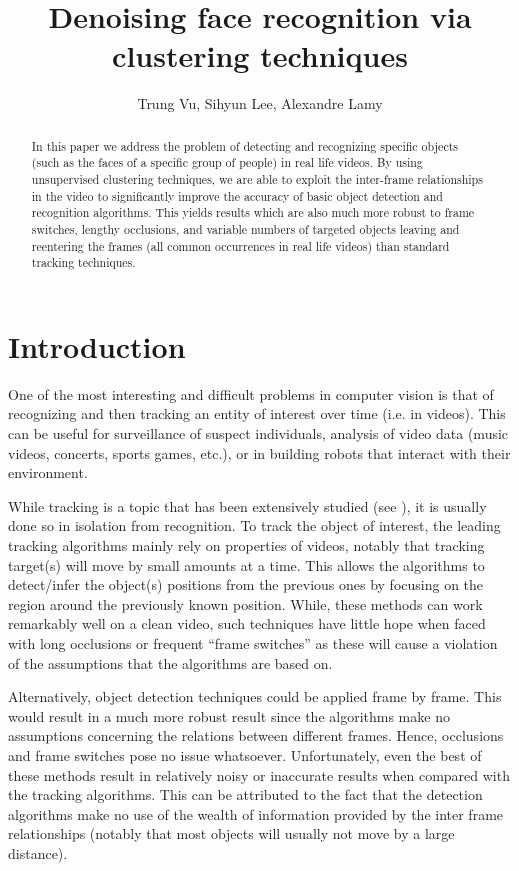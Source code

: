 \documentclass{article}
\title{Denoising face recognition via clustering techniques}
\author{Trung Vu, Sihyun Lee, Alexandre Lamy%
}
\begin{document}

\maketitle

\begin{abstract}
  In this paper we address the problem of detecting and recognizing specific objects (such as the faces of a specific group of people)
  in real life videos. By using unsupervised clustering techniques, we are able to exploit the inter-frame relationships in the
  video to significantly improve the accuracy of basic object detection and recognition algorithms. This yields results which are
  also much more robust to frame switches, lengthy occlusions, and variable numbers of targeted objects leaving and reentering the frames
  (all common occurrences in real life videos) than standard tracking techniques.
\end{abstract}

\section{Introduction}



One of the most interesting and difficult problems in computer vision is that of recognizing and then tracking an
entity of interest over time (i.e. in videos). This can be useful for surveillance of suspect individuals,
analysis of video data (music videos, concerts, sports games, etc.), or in building robots that interact with their
environment.

While tracking is a topic that has been extensively studied (see \cite{benchmarksurvey}), it is usually
done so in isolation from recognition. To track the object of interest, the leading tracking algorithms mainly rely on
properties of videos, notably that tracking target(s)
will move by small amounts at a time. This allows the algorithms to detect/infer the object(s) positions from the previous ones by
focusing on the region around the previously known position. While, these methods can work remarkably well on a clean video, such techniques have
little hope when faced with long occlusions or frequent ``frame switches'' as these will cause a violation of the assumptions that the algorithms are based on.

Alternatively, object detection techniques could be applied frame by frame. This would result in a much more robust result since the algorithms
make no assumptions concerning the relations between different frames. Hence, occlusions and frame switches pose no issue whatsoever. Unfortunately, even
the best of these methods result in relatively noisy or inaccurate results when compared with the tracking algorithms. This can be attributed to the fact that the detection
algorithms make no use of the wealth of information provided by the inter frame relationships (notably that most objects will usually not move by a large distance).
\end{document}
